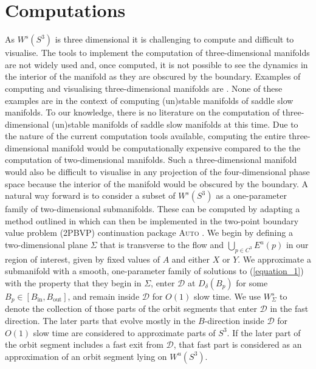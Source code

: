 \documentclass{ws-ijbc}
\begin{document}
\section{Computations}
     
As $W^s(S^3)$ is three dimensional it is challenging to compute and difficult to visualise.  The tools to implement the computation of three-dimensional manifolds are not widely used and, once computed, it is not possible to see the dynamics in the interior of the manifold as they are obscured by the boundary.  Examples of computing and visualising three-dimensional manifolds are \cite{Initial_conditions_volume, Invariant_tori_again, Invariant_tori}.  None of these examples are in the context of computing (un)stable manifolds of saddle slow manifolds.  To our knowledge, there is no literature on the computation of three-dimensional (un)stable manifolds of saddle slow manifolds at this time.  Due to the nature of the current computation tools available, computing the entire three-dimensional manifold would be computationally expensive compared to the the computation of two-dimensional manifolds. Such a three-dimensional manifold would also be difficult to visualise in any projection of the four-dimensional phase space because the interior of the manifold would be obscured by the boundary.  A natural way forward is to consider a subset of $W^s(S^3)$ as a one-parameter family of two-dimensional submanifolds.  These can be computed by adapting a method outlined in \cite{Saeed_Paper} which can then be implemented in the two-point boundary value problem (2PBVP) continuation package \textsc{Auto} \cite{AUTO}.  We begin by defining a two-dimensional plane $\Sigma$  that is transverse to the flow and $\bigcup_{p \in C^3} E^u(p)$ in our region of interest, given by fixed values of $A$ and either $X$ or $Y$.  We approximate a submanifold with a smooth, one-parameter family of solutions to (\ref{equation_1}) with the property that they begin in $\Sigma$, enter $\mathscr{D}$ at $D_{\delta}(B_p)$ for some $B_p \in [B_{\text{in}}, B_{\text{out}}]$, and remain inside $\mathscr{D}$ for $O(1)$ slow time.  We use $W^{s}_{\Sigma}$ to denote the collection of those parts of the orbit segments that enter $\mathscr{D}$ in the fast direction.  The later parts that evolve mostly in the $B$-direction inside $\mathscr{D}$ for $O(1)$ slow time are considered to approximate parts of $S^3$.  If the later part of the orbit segment includes a fast exit from $\mathscr{D}$, that fast part is considered as an approximation of an orbit segment lying on $W^u(S^3)$.
  
\end{document}
